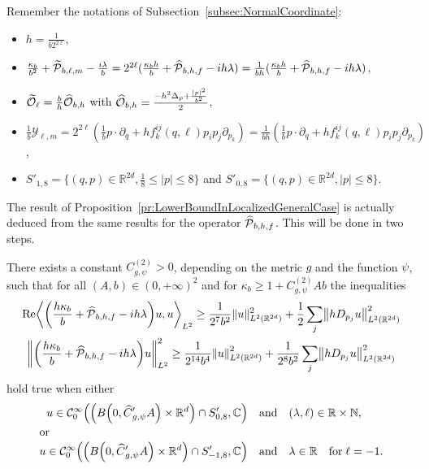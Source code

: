\documentclass[10pt]{amsart}
\theoremstyle{definition}\newtheorem{defi}[theo]{Definition}\newtheorem{rema}[theo]{Remark}\newtheorem{exam}[theo]{Example}\newtheorem{exem}[theo]{Example}\newtheorem{nota}[theo]{Notation}
\newcommand{\C}{\mathbb{C}}
\newcommand{\R}{\mathbb{R}}
\newcommand{\N}{\mathbb{N}}
\newcommand{\clC}{\mathcal{C}}
\newcommand{\clY}{\mathcal{Y}}
\newcommand{\clO}{\mathcal{O}}
\newcommand{\clP}{\mathcal{P}}
\DeclareMathOperator{\Ree}{Re}
\let\oldtilde\tilde
\renewcommand*{\tilde}[1]{\mathchoice{\widetilde{#1}}{\widetilde{#1}}{\oldtilde{#1}}{\oldtilde{#1}}}
\let\oldhat\hat
\renewcommand*{\hat}[1]{\mathchoice{\widehat{#1}}{\widehat{#1}}{\oldhat{#1}}{\oldhat{#1}}}
\let\originalleft\left
\let\originalright\right
\renewcommand{\left}{\mathopen{}\mathclose\bgroup\originalleft}
\renewcommand{\right}{\aftergroup\egroup\originalright}
\newcounter{setofstep}
\newcounter{step}[setofstep]
\begin{document}
Remember the notations of Subsection~\ref{subsec:NormalCoordinate}:
\begin{itemize}
\item $h=\frac{1}{b2^{2\ell}}$,
\item $\frac{\kappa_{b}}{b^{2}} + \tilde{\clP}_{b,\ell,m} - \frac{i\lambda}{b}= 2^{2\ell}
(\frac{\kappa_{b}h}{b} + \hat{\clP}_{b,h,f} - i h \lambda)=\frac{1}{bh}(\frac{\kappa_{b}h}{b} + \hat{\clP}_{b,h,f} - i h \lambda)$, 
\item $\tilde{\clO}_{\ell}=\frac{b}{h}\hat{\clO}_{b,h}$ with $\hat{\clO}_{b,h}=\frac{-h^2\Delta_p+\frac{|p|^2}{b^2}}{2}$,
\item $\frac{1}{b}\clY_{\ell,m}=2^{2\ell}(\frac{1}{b}p\cdot \partial_q +hf^{ij}_{k}(q,\ell)p_i p_j\partial_{p_k})=\frac{1}{bh}(\frac{1}{b}p\cdot \partial_q +hf^{ij}_{k}(q,\ell)p_i p_j\partial_{p_k})$,
\item $S'_{1,8}=\{(q,p)\in\R^{2d}, \frac{1}{8}\leq |p|\leq 8\}$ and $S'_{0,8}=\{(q,p)\in\R^{2d}, |p|\leq 8\}$.
\end{itemize}
The result of Proposition~\ref{pr:LowerBoundInLocalizedGeneralCase} is actually deduced from the same results for the operator $\hat{\clP}_{b,h,f}$. This will be done in two steps.

\begin{prop}\label{proposition:RefinedIntegrationByPart}
There exists a constant $C_{g,\psi}^{(2)}>0$, depending on the metric $g$ and the function $\psi$, such that for all $(A,b)\in (0,+\infty)^2$ and for $\kappa_b \geq 1+C_{g,\psi}^{(2)}Ab$ the inequalities
\begin{gather}
\Ree \left\langle \left(\frac{h\kappa_b}{b} + \hat{\clP}_{b,h,f} - ih\lambda \right) u, u \right\rangle_{L^2} \geq \frac{1}{2^7 b^2} \|u\|_{L^2(\R^{2d})}^2 + \frac{1}{2} \sum_j\left\|hD_{p_j}u \right\|_{L^2(\R^{2d})}^2
\label{eq:IPPPbhf}
\\
\left\| \left(\frac{h \kappa_{b}}{b} + \hat{\clP}_{b,h,f} -i h\lambda \right) u \right\|_{L^2}^{2} \geq \frac{1}{2^{14} b^4} \left\| u \right\|_{L^2(\R^{2d})}^{2} + \frac{1}{2^8 b^2} \sum_j \left\| hD_{p_{j}}u \right\|_{L^2(\R^{2d})}^{2}\label{eq:RefinedIppeq}
\end{gather}
hold true
when either
\begin{align*}
u \in \clC^\infty_0\left(\left(B\left(0,\hat{C}'_{g,\psi}A\right)\times \R^d\right)\cap S_{0,8}',\C\right)\quad&\text{and}\quad (\lambda,\ell)\in \R\times \N,\\
\intertext{or}
u \in \clC^\infty_0\left(\left(B\left(0,\hat{C}'_{g,\psi}A\right)\times \R^d\right)\cap S_{-1,8}',\C\right)\quad &\text{and}\quad \lambda\in \R\quad\text{for}\; \ell=-1.
\end{align*}
\end{prop}
\end{document}
